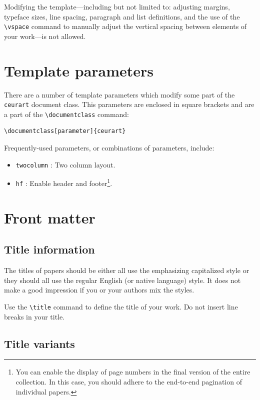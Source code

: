 \documentclass[%
]{ceurart}
\begin{document}
Modifying the template---including but not limited to: adjusting margins, typeface sizes, line spacing, paragraph and list definitions, and the use of the
\verb|\vspace|
 command to manually adjust the vertical spacing between elements of your work---is not allowed.

\section{Template parameters}

There are a number of template parameters which modify some part of the
\verb|ceurart|
 document class.
This parameters are enclosed in square brackets and are a part of the
\verb|\documentclass|
 command:
\begin{lstlisting}[language={[latex]TeX}]
\documentclass[parameter]{ceurart}
\end{lstlisting}

Frequently-used parameters, or combinations of parameters, include:
\begin{itemize}
\item
\verb|twocolumn|
 : Two column layout.
\item
\verb|hf|
 : Enable header and footer\footnote{You can enable the display of page numbers in the final version of the entire collection. In this case, you should adhere to the end-to-end pagination of individual papers.}.
\end{itemize}

\section{Front matter}

\subsection{Title information}

The titles of papers should be either all use the emphasizing capitalized style or they should all use the regular English (or native language) style.
It does not make a good impression if you or your authors mix the styles.

Use the
\verb|\title|
command to define the title of your work. Do not insert line breaks in your title.

\subsection{Title variants}
\end{document}
